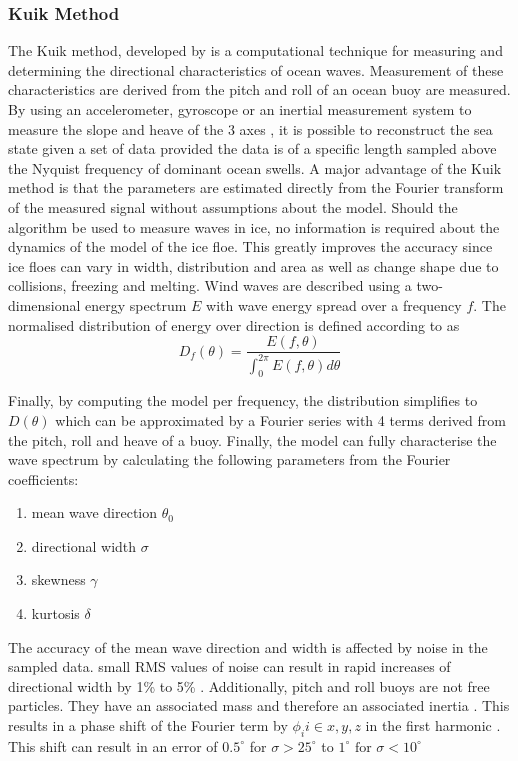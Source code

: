 \subsubsection{Kuik Method}
\label{kuik}
The Kuik method, developed by \textcite{kuik1988method} is a computational technique for measuring and determining the directional characteristics of ocean waves. Measurement of these characteristics are derived from the pitch and roll of an ocean buoy are measured. By using an accelerometer, gyroscope or an inertial measurement system to measure the slope and heave of the 3 axes \cite{kuik1988method}, it is possible to reconstruct the sea state given a set of data provided the data is of a specific length sampled above the Nyquist frequency of dominant ocean swells. A major advantage of the Kuik method is that the parameters are estimated directly from the Fourier transform of the measured signal \cite{kuik1988method} without assumptions about the model. Should the algorithm be used to measure waves in ice, no information is required about the dynamics of the model of the ice floe. This greatly improves the accuracy since ice floes can vary in width, distribution and area as well as change shape due to collisions, freezing and melting. Wind waves are described using a two-dimensional energy spectrum $E$ with wave energy spread over a frequency $f$. The normalised distribution of energy over direction is defined according to \textcite{kuik1988method} as
\begin{equation}
	D_f(\theta) = \frac{E(f,\theta)}{\int_0^{2
			\pi}E(f,\theta)d\theta}
\end{equation} 

Finally, by computing the model per frequency, the distribution simplifies to $D(\theta)$ which can be approximated by a Fourier series with 4 terms \cite{kuik1988method} derived from the pitch, roll and heave of a buoy. Finally, the model can fully characterise the wave spectrum by calculating the following parameters from the Fourier coefficients:

\begin{enumerate}
	\item mean wave direction $\theta_0$
	\item directional width $\sigma$
	\item skewness $\gamma$
	\item kurtosis $\delta$ 
\end{enumerate}

The accuracy of the mean wave direction and width is affected by noise in the sampled data. small RMS values of noise can result in rapid increases of directional width by 1\% to 5\% \cite{kuik1988method}. Additionally, pitch and roll buoys are not free particles. They have an associated mass and therefore an associated inertia \cite{kuik1988method}. This results in a phase shift of the Fourier term by $\phi_i i \in {x,y,z}$  in the first harmonic \cite{kuik1988method}. This shift can result in an error of $0.5^\circ $ for $\sigma > 25 ^\circ $ to $1^\circ \text{ for } \sigma < 10^\circ $ \cite{kuik1988method}   

